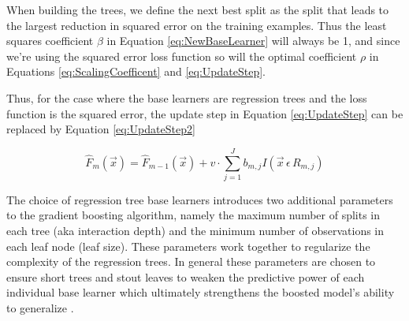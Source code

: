 \documentclass[9pt, conference]{IEEEtran}
\begin{document}
When building the trees, we define the next best split as the split that leads to the largest reduction in squared error on the training examples. Thus the least squares coefficient \(\beta\) in Equation \ref{eq:NewBaseLearner} will always be 1, and since we're using the squared error loss function so will the optimal coefficient \(\rho\) in Equations \ref{eq:ScalingCoefficent} and \ref{eq:UpdateStep}. 


Thus, for the case where the base learners are regression trees and the loss function is the squared error, the update step in Equation \ref{eq:UpdateStep} can be replaced by Equation \ref{eq:UpdateStep2}

\begin{equation}
\hat{F}_m(\vec{x}) = \hat{F}_{m-1}(\vec{x}) + v  \cdot \sum_{j=1}^{J}b_{m,j}I(\vec{x} \, \epsilon \, R_{m,j})
\label{eq:UpdateStep2}
\end{equation}

The choice of regression tree base learners introduces two additional parameters to the gradient boosting algorithm, namely the maximum number of splits in each tree (aka interaction depth) and the minimum number of observations in each leaf node (leaf size). These parameters work together to regularize the complexity of the regression trees. In general these parameters are chosen to ensure short trees and stout leaves to weaken the predictive power of each individual base learner which ultimately strengthens the boosted model's ability to generalize \cite{ecological}. 
\end{document}

